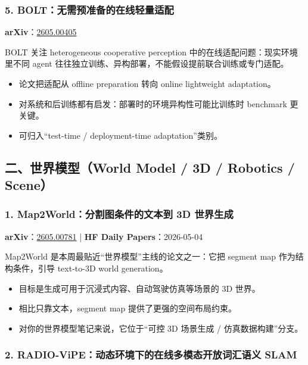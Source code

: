 \subsubsection{5. BOLT：无需预准备的在线轻量适配}

\textbf{arXiv}：\href{https://arxiv.org/abs/2605.00405}{2605.00405}

BOLT 关注 heterogeneous cooperative perception 中的在线适配问题：现实环境里不同 agent 往往独立训练、异构部署，不能假设提前联合训练或专门适配。

\begin{itemize}[leftmargin=1.5em]
  \item 论文把适配从 offline preparation 转向 online lightweight adaptation。
  \item 对系统和后训练都有启发：部署时的环境异构性可能比训练时 benchmark 更关键。
  \item 可归入“test-time / deployment-time adaptation”类别。
\end{itemize}

\subsection{二、世界模型（World Model / 3D / Robotics / Scene）}

\subsubsection{1. Map2World：分割图条件的文本到 3D 世界生成}

\textbf{arXiv}：\href{https://arxiv.org/abs/2605.00781}{2605.00781} | \textbf{HF Daily Papers}：2026-05-04

Map2World 是本周最贴近“世界模型”主线的论文之一：它把 segment map 作为结构条件，引导 text-to-3D world generation。

\begin{itemize}[leftmargin=1.5em]
  \item 目标是生成可用于沉浸式内容、自动驾驶仿真等场景的 3D 世界。
  \item 相比只靠文本，segment map 提供了更强的空间布局约束。
  \item 对你的世界模型笔记来说，它位于“可控 3D 场景生成 / 仿真数据构建”分支。
\end{itemize}

\subsubsection{2. RADIO-ViPE：动态环境下的在线多模态开放词汇语义 SLAM}


